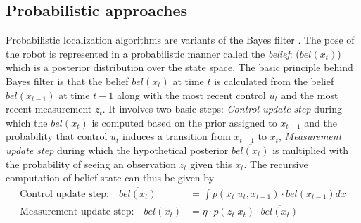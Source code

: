 \subsection{Probabilistic approaches}
\label{ssec:prob_approaches}
Probabilistic localization algorithms are variants of the Bayes filter \cite{thrun2005probabilistic}. The pose of the robot is represented in a probabilistic manner called the \emph{belief}: ($bel(x_t)$) which is a posterior distribution over the state space. The basic principle behind Bayes filter is that the belief $bel(x_t)$ at time $t$ is calculated from the belief $bel(x_{t-1})$ at time $t-1$ along with the most recent control $u_t$ and the most recent measurement $z_t$. It involves two basic steps: \emph{Control update step} during which the $\overline{bel(x_t)}$ is computed based on the prior assigned to $x_{t-1}$ and the probability that control $u_t$ induces a transition from $x_{t-1}$ to $x_t$, \emph{Measurement update step} during which the hypothetical posterior $\overline{bel(x_t)}$ is multiplied with the probability of seeing an observation $z_t$ given this $x_t$. The recursive computation of belief state can thus be given by
\begin{align*}
\text{Control update step:}\quad \overline{bel(x_t)} &= \int p(x_t\vert u_t,x_{t-1})\cdot bel(x_{t-1}) dx \\
\text{Measurement update step:}\quad {bel(x_t)} &= \eta\cdot p(z_t\vert x_{t})\cdot \overline{bel(x_t)}
\end{align*}
